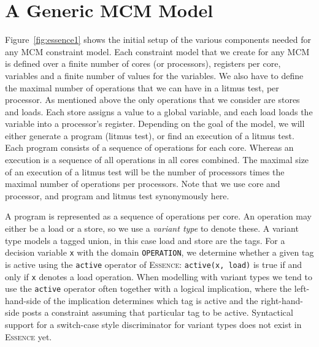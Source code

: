 \documentclass[runningheads]{llncs}
\newcommand{\essence}[0]{\textsc{Essence}}
\begin{document}
\section{A Generic MCM Model}


Figure~\ref{fig:essence1} shows the initial setup of the various components needed for any MCM constraint model.
Each constraint model that we create for any MCM is defined over a finite number of cores (or processors), registers per core, variables and a finite number of values for the variables.
We also have to define the maximal number of operations that we can have in a litmus test, per processor.
As mentioned above the only operations that we consider are stores and loads.
Each store assigns a value to a global variable, and each load loads the variable into a processor's register.
Depending on the goal of the model, we will either generate a program (litmus test), or find an execution of a litmus test.
Each program consists of a sequence of operations for each core.
Whereas an execution is a sequence of all operations in all cores combined.
The maximal size of an execution of a litmus test will be the number of processors times the maximal number of operations per processors.
Note that we use core and processor, and program and litmus test synonymously here.

A program is represented as a sequence of operations per core. An operation may either be a load or a store, so we use a \emph{variant type} to denote these. A variant type models a tagged union, in this case load and store are the tags. For a decision variable \texttt{x} with the domain \texttt{OPERATION}, we determine whether a given tag is active using the \texttt{active} operator of \essence{}: \texttt{active(x, load)} is true if and only if \texttt{x} denotes a load operation. When modelling with variant types we tend to use the \texttt{active} operator often together with a logical implication, where the left-hand-side of the implication determines which tag is active and the right-hand-side posts a constraint assuming that particular tag to be active. Syntactical support for a switch-case style discriminator for variant types does not exist in \essence{} yet.
\end{document}

